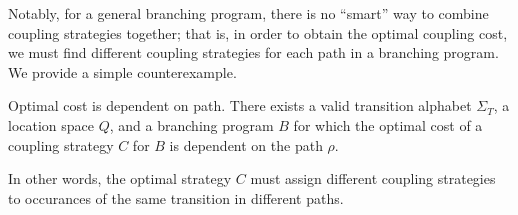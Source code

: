 
Notably, for a general branching program, there is no ``smart'' way to combine coupling strategies together; that is, in order to obtain the optimal coupling cost, we must find different coupling strategies for each path in a branching program. We provide a simple counterexample.

\begin{prop}\label{costDependspathProp}
    Optimal cost is dependent on path. There exists a valid transition alphabet $\Sigma_T$, a location space $Q$, and a branching program $B$ for which the optimal cost of a coupling strategy $C$ for $B$ is dependent on the path $\rho$. 
    
    In other words, the optimal strategy $C$ must assign different coupling strategies to occurances of the same transition in different paths. 
\end{prop}

